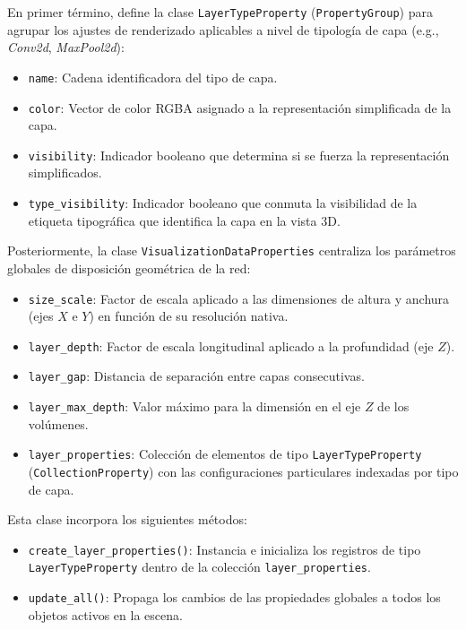 En primer término, define la clase \texttt{LayerTypeProperty} (\texttt{PropertyGroup}) para agrupar los ajustes de renderizado 
aplicables a nivel de tipología de capa (e.g., \textit{Conv2d}, \textit{MaxPool2d}):
\begin{itemize}
    \item \texttt{name}: Cadena identificadora del tipo de capa.
    \item \texttt{color}: Vector de color RGBA asignado a la representación simplificada de la capa.
    \item \texttt{visibility}: Indicador booleano que determina si se fuerza la representación simplificados.
    \item \texttt{type\_visibility}: Indicador booleano que conmuta la visibilidad de la etiqueta tipográfica 
    que identifica la capa en la vista 3D.
\end{itemize}

Posteriormente, la clase \texttt{VisualizationDataProperties} centraliza los parámetros globales de disposición geométrica de la red:
\begin{itemize}
    \item \texttt{size\_scale}: Factor de escala aplicado a las dimensiones de altura y anchura (ejes $X$ e $Y$) en función de su resolución nativa.
    \item \texttt{layer\_depth}: Factor de escala longitudinal aplicado a la profundidad (eje $Z$).
    \item \texttt{layer\_gap}: Distancia de separación entre capas consecutivas.
    \item \texttt{layer\_max\_depth}: Valor máximo para la dimensión en el eje $Z$ de los volúmenes.
    \item \texttt{layer\_properties}: Colección de elementos de tipo \texttt{LayerTypeProperty} (\texttt{CollectionProperty}) 
    con las configuraciones particulares indexadas por tipo de capa.
\end{itemize}

Esta clase incorpora los siguientes métodos:
\begin{itemize}
    \item \texttt{create\_layer\_properties()}: Instancia e inicializa los registros de tipo \texttt{LayerTypeProperty} dentro 
    de la colección \texttt{layer\_properties}.
    \item \texttt{update\_all()}: Propaga los cambios de las propiedades globales a todos los objetos activos en la escena.
\end{itemize}

